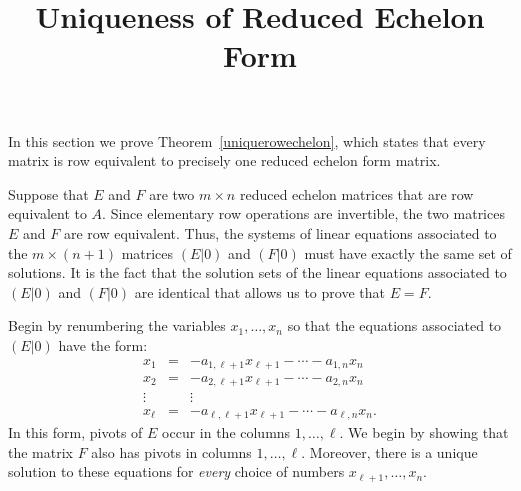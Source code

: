 \documentclass{ximera}
\title{Uniqueness of Reduced Echelon Form}
\begin{document}
\begin{abstract}
\end{abstract}
\maketitle


\label{S:uniquerowechelon}


In this section we prove Theorem~\ref{uniquerowechelon}, which
states that every matrix is row equivalent to precisely one
reduced echelon form matrix.  

Suppose that $E$ and $F$ are two $m\times n$ reduced echelon
matrices that are row equivalent to $A$.  Since elementary row
operations are invertible, the two matrices $E$ and $F$ are
row equivalent.  Thus, the systems of linear equations associated to 
the $m\times (n+1)$ matrices $(E|0)$ and $(F|0)$ must have exactly the
same set of solutions.  It is the fact that the solution sets
of the linear equations associated to $(E|0)$ and $(F|0)$ are
identical that allows us to prove that $E=F$.

Begin by renumbering the variables $x_1,\ldots,x_n$ so that the equations 
associated to $(E|0)$ have the form: 
\begin{equation}  \label{e1-ell2a}
\begin{array}{rcl}
  x_1  & = &  - a_{1,\ell+1}x_{\ell+1} - \cdots - a_{1,n}x_n\\
  x_2  & = &  - a_{2,\ell+1}x_{\ell+1} - \cdots - a_{2,n}x_n\\
\vdots &   &    \vdots \\
x_\ell & = &  - a_{\ell,\ell+1}x_{\ell+1} - \cdots - a_{\ell,n}x_n.
\end{array}
\end{equation}
In this form, pivots of $E$ occur in the columns $1,\ldots,\ell$.  We begin 
by showing that the matrix $F$ also has pivots in columns $1,\ldots,\ell$. 
Moreover, there is a unique solution to these equations for {\em every\/}
choice of numbers $x_{\ell+1},\ldots,x_n$.  
\end{document}
